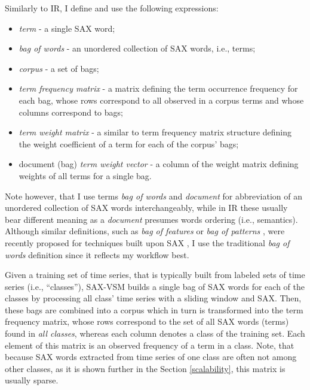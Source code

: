 Similarly to IR, I define and use the following expressions:
\begin{itemize}
  \item \textit{term} - a single SAX word;
  \item \textit{bag of words} - an unordered collection of SAX words, i.e., terms;
  \item \textit{corpus} - a set of bags;
  \item \textit{term frequency matrix} - a matrix defining the term occurrence frequency for each bag, 
  whose rows correspond to all observed in a corpus terms and whose columns correspond to bags;
  \item \textit{term weight matrix} - a similar to term frequency matrix structure defining the weight coefficient 
  of a term for each of the corpus' bags;
  \item document (bag) \textit{term weight vector} - a column of the weight matrix defining weights of all terms for a single bag.
\end{itemize}
Note however, that I use terms \textit{bag of words} and \textit{document} for abbreviation of an unordered 
collection of SAX words interchangeably, while in IR these usually bear different meaning as a \textit{document} 
presumes words ordering (i.e., semantics). 
Although similar definitions, such as \textit{bag of features} \cite{citeulike:12636726} 
or \textit{bag of patterns} \cite{citeulike:10525778}, were recently proposed for techniques built 
upon SAX \cite{citeulike:10525778}, I use the traditional \textit{bag of words} definition since it reflects 
my workflow best. 

Given a training set of time series, that is typically built from labeled sets of time series (i.e., ``classes''), 
SAX-VSM builds a single bag of SAX words for each of the classes by processing all class' time series with a sliding 
window and SAX. Then, these bags are combined into a corpus 
which in turn is transformed into the term frequency matrix, whose rows correspond to the set of all SAX words (terms) 
found in \textit{all classes}, whereas each column denotes a class of the training set. 
Each element of this matrix is an observed frequency of a term in a class. 
Note, that because SAX words extracted from time series of one class are often not among other classes, 
as it is shown further in the Section \ref{scalability}, this matrix is usually sparse. 

